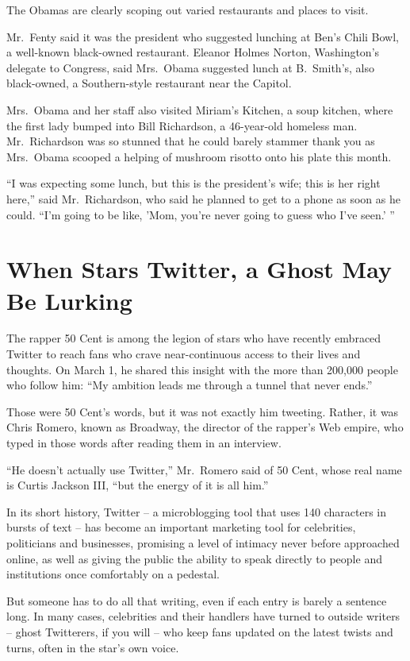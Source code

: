 \documentclass[12pt,a4paper,onecolumn]{article}
\begin{document}
\begin{CJK*}{GBK}{song}
The Obamas are clearly scoping out varied restaurants and places to visit.

Mr.~Fenty said it was the president who suggested lunching at Ben's Chili Bowl, a well-known
black-owned restaurant. Eleanor Holmes Norton, Washington's delegate to Congress, said Mrs.~Obama
suggested lunch at B.~Smith's, also black-owned, a Southern-style restaurant near the Capitol.

Mrs.~Obama and her staff also visited Miriam's Kitchen, a soup kitchen, where the first lady bumped
into Bill Richardson, a 46-year-old homeless man. Mr.~Richardson was so stunned that he could barely
stammer thank you as Mrs.~Obama scooped a helping of mushroom risotto onto his plate this month.

``I was expecting some lunch, but this is the president's wife; this is her right here,'' said
Mr.~Richardson, who said he planned to get to a phone as soon as he could. ``I'm going to be like,
'Mom, you're never going to guess who I've seen.' ''

\section{When Stars Twitter, a Ghost May Be Lurking}

The rapper 50 Cent is among the legion of stars who have recently embraced Twitter to reach fans who
crave near-continuous access to their lives and thoughts. On March 1, he shared this insight with
the more than 200,000 people who follow him: ``My ambition leads me through a tunnel that never
ends.''

Those were 50 Cent's words, but it was not exactly him tweeting. Rather, it was Chris Romero, known
as Broadway, the director of the rapper's Web empire, who typed in those words after reading them in
an interview.

``He doesn't actually use Twitter,'' Mr.~Romero said of 50 Cent, whose real name is Curtis Jackson
III, ``but the energy of it is all him.''

In its short history, Twitter -- a microblogging tool that uses 140 characters in bursts of text --
has become an important marketing tool for celebrities, politicians and businesses, promising a
level of intimacy never before approached online, as well as giving the public the ability to speak
directly to people and institutions once comfortably on a pedestal.

But someone has to do all that writing, even if each entry is barely a sentence long. In many cases,
celebrities and their handlers have turned to outside writers -- ghost Twitterers, if you will --
who keep fans updated on the latest twists and turns, often in the star's own voice.


\end{CJK*}
\end{document}
